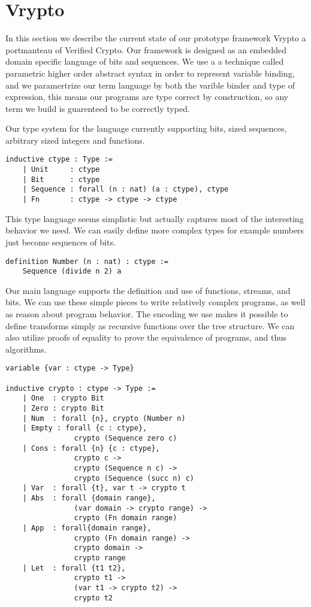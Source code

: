 \section{Vrypto}

In this section we describe the current state of our prototype framework Vrypto
a portmanteau of Verified Crypto. Our framework is designed as an
embedded domain specific language of bits and sequences. We use a
a technique called parametric higher order abstract syntax in order
to represent variable binding, and we paramertrize our term language by both
the varible binder and type of expression, this means our programs are type
correct by construction, so any term we build is guarenteed to be correctly typed.

Our type system for the language currently supporting bits, sized sequences,
arbitrary sized integers and functions.

\begin{verbatim}
inductive ctype : Type :=
    | Unit     : ctype
    | Bit      : ctype
    | Sequence : forall (n : nat) (a : ctype), ctype
    | Fn       : ctype -> ctype -> ctype
\end{verbatim}

This type language seems simplistic but actually captures most of the interesting
behavior we need. We can easily define more complex types for example numbers
just become sequences of bits.

\begin{verbatim}
definition Number (n : nat) : ctype :=
    Sequence (divide n 2) a
\end{verbatim}

Our main language supports the definition and use of functions, streams, and bits.
We can use these simple pieces to write relatively complex programs, as well
as reason about program behavior. The encoding we use makes it possible to
define transforms simply as recursive functions over the tree structure. We
can also utilize proofs of equality to prove the equivalence of programs,
and thus algorithms.

\begin{verbatim}
variable {var : ctype -> Type}

inductive crypto : ctype -> Type :=
    | One  : crypto Bit
    | Zero : crypto Bit
    | Num  : forall {n}, crypto (Number n)
    | Empty : forall {c : ctype},
                crypto (Sequence zero c)
    | Cons : forall {n} {c : ctype},
                crypto c ->
                crypto (Sequence n c) ->
                crypto (Sequence (succ n) c)
    | Var  : forall {t}, var t -> crypto t
    | Abs  : forall {domain range},
                (var domain -> crypto range) ->
                crypto (Fn domain range)
    | App  : forall{domain range},
                crypto (Fn domain range) ->
                crypto domain ->
                crypto range
    | Let  : forall {t1 t2},
                crypto t1 ->
                (var t1 -> crypto t2) ->
                crypto t2
\end{verbatim}

